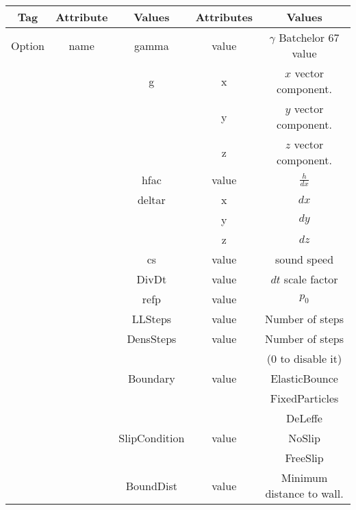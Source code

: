 \begin{table}[h!b!p!]\small
	\centering
	\begin{tabular}{| c | c | c | c | c | }
		\hline
		\cellcolor[rgb]{0.7,0.7,0.7}Tag & \cellcolor[rgb]{0.7,0.7,0.7}Attribute & \cellcolor[rgb]{0.7,0.7,0.7}Values & \cellcolor[rgb]{0.7,0.7,0.7}Attributes & \cellcolor[rgb]{0.7,0.7,0.7}Values \\
		\hline
		Option & name & gamma              & value & $\gamma$ Batchelor 67 value \\
		\hline
		       &      & g                  & x     & $x$ vector component. \\
		       &      &                    & y     & $y$ vector component. \\
		       &      &                    & z     & $z$ vector component. \\
		\hline
		       &      & hfac               & value & $\frac{h}{dx}$ \\
		\hline
		       &      & deltar             & x     & $dx$ \\
		       &      &                    & y     & $dy$ \\
		       &      &                    & z     & $dz$ \\
		\hline
		       &      & cs                 & value & sound speed \\
		\hline
		       &      & DivDt              & value & $dt$ scale factor \\
		\hline
		       &      & refp               & value & $p_0$ \\
		\hline
		       &      & LLSteps            & value  & Number of steps \\
		\hline
		       &      & DensSteps          & value  & Number of steps \\
		       &      &                    &        & (0 to disable it) \\
		\hline
		       &      & Boundary           & value  & ElasticBounce \\
		       &      &                    &        & FixedParticles \\
		       &      &                    &        & DeLeffe \\
		\hline
		       &      & SlipCondition      & value  & NoSlip \\
		       &      &                    &        & FreeSlip \\
		\hline
		       &      & BoundDist          & value  & Minimum distance to wall. \\

\end{tabular}
\end{table}
